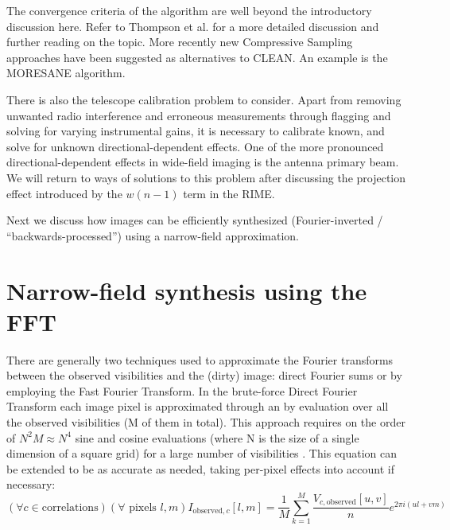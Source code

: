 The convergence criteria of the algorithm are well beyond the introductory discussion here. Refer to Thompson et 
al. \cite[ch 11]{thompson2008interferometry} for a more detailed discussion and further reading on the topic. More
recently new Compressive Sampling approaches have been suggested as alternatives to CLEAN. An example is the 
MORESANE \cite{dabbech2015moresane} algorithm.

There is also the telescope calibration problem to consider. Apart from removing unwanted
radio interference and erroneous measurements through flagging and solving for varying instrumental gains, it is 
necessary to calibrate known, and solve for unknown directional-dependent effects. One of the more pronounced directional-dependent 
effects in wide-field imaging is the antenna primary beam. We will return to ways of solutions to this problem 
after discussing the projection effect introduced by the $w(n-1)$ term in the RIME.

Next we discuss how images can be efficiently synthesized (Fourier-inverted / ``backwards-processed'') using a narrow-field approximation.
\section{Narrow-field synthesis using the FFT}
 There are generally two techniques used to approximate the Fourier transforms between the observed visibilities and the (dirty) image: direct Fourier sums or by employing
 the Fast Fourier Transform. In the brute-force Direct Fourier Transform each image pixel is approximated through an by evaluation over all the observed 
 visibilities (M of them in total). This approach requires on the order of $N^2M \approx N^4$ sine and cosine evaluations (where N is the size of a single dimension of a square grid) for a large 
 number of visibilities \cite[Lecture 7]{taylor1999synthesis}. This equation can be extended to be as accurate as needed, taking per-pixel effects into 
 account if necessary:
 \begin{equation}
  (\forall c\in\text{correlations})(\forall\text{ pixels }l,m) I_{\text{observed},c}[l,m] = \frac{1}{M}\sum_{k=1}^{M}{\frac{V_{c,\text{observed}}[u,v]}{n}e^{2\pi i (ul + vm)}}
 \end{equation} 
 
